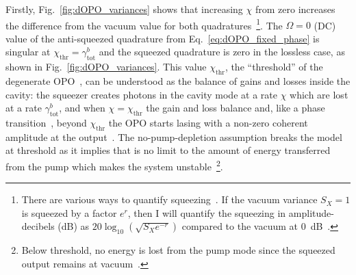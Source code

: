 Firstly, Fig.~\ref{fig:dOPO_variances} shows that increasing $\chi$ from zero increases the difference from the vacuum value for both quadratures~\footnote{There are various ways to quantify squeezing~\cite{}. If the vacuum variance $S_X=1$ is squeezed by a factor $e^r$, then I will quantify the squeezing in amplitude-decibels (dB) as $20 \log_{10}(\sqrt{S_X e^{-r}})$ compared to the vacuum at 0~dB~\cite{}.}. %
The $\Omega=0$ (DC) value of the anti-squeezed quadrature from Eq.~\ref{eq:dOPO_fixed_phase} is singular at $\chi_\text{thr}=\gamma^b_\text{tot}$ and the squeezed quadrature is zero in the lossless case, as shown in Fig.~\ref{fig:dOPO_variances}. %
This value $\chi_\text{thr}$, the ``threshold'' of the degenerate OPO~\cite{}, %
can be understood as the balance of gains and losses inside the cavity: the squeezer creates photons in the cavity mode at a rate $\chi$ which are lost at a rate $\gamma^b_\text{tot}$, and when $\chi=\chi_\text{thr}$ the gain and loss balance and, like a phase transition~\cite{}, beyond $\chi_\text{thr}$ the OPO starts lasing with a non-zero coherent amplitude at the output~\cite{}. %
The no-pump-depletion assumption breaks the model at threshold as it implies that is no limit to the amount of energy transferred from the pump which makes the system unstable~\footnote{Below threshold, no energy is lost from the pump mode since the squeezed output remains at vacuum~\cite{}.}. 
